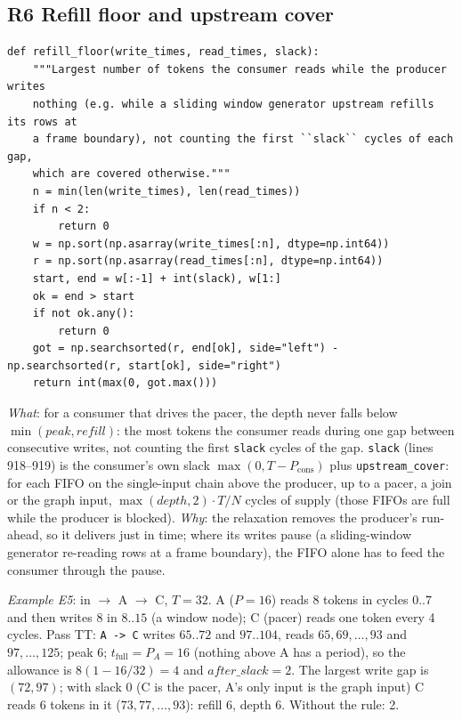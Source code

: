 \documentclass[10pt,a4paper]{article}
\newcommand{\code}[1]{\texttt{#1}}
\newcommand{\Tg}{T}           %
\newcommand{\NF}{N}            %
\begin{document}
\subsection{R6 Refill floor and upstream cover}\label{sec:refill}

\begin{lstlisting}[firstnumber=765,title={\texttt{src/finn/transformation/fpgadataflow/derive\_characteristic.py}, lines 765--780}]
def refill_floor(write_times, read_times, slack):
    """Largest number of tokens the consumer reads while the producer writes
    nothing (e.g. while a sliding window generator upstream refills its rows at
    a frame boundary), not counting the first ``slack`` cycles of each gap,
    which are covered otherwise."""
    n = min(len(write_times), len(read_times))
    if n < 2:
        return 0
    w = np.sort(np.asarray(write_times[:n], dtype=np.int64))
    r = np.sort(np.asarray(read_times[:n], dtype=np.int64))
    start, end = w[:-1] + int(slack), w[1:]
    ok = end > start
    if not ok.any():
        return 0
    got = np.searchsorted(r, end[ok], side="left") - np.searchsorted(r, start[ok], side="right")
    return int(max(0, got.max()))
\end{lstlisting}

\emph{What}: for a consumer that drives the pacer, the depth never falls below
$\min(\mathit{peak},\mathit{refill})$: the most tokens the consumer reads during
one gap between consecutive writes, not counting the first \code{slack} cycles of
the gap. \code{slack} (lines 918--919) is the consumer's own slack
$\max(0,\Tg-P_{\mathrm{cons}})$ plus \code{upstream\_cover}: for each FIFO on the
single-input chain above the producer, up to a pacer, a join or the graph input,
$\max(\mathit{depth},2)\cdot\Tg/\NF$ cycles of supply (those FIFOs are full while the
producer is blocked). \emph{Why}: the relaxation removes the producer's run-ahead,
so it delivers just in time; where its writes pause (a sliding-window generator
re-reading rows at a frame boundary), the FIFO alone has to feed the consumer
through the pause.

\emph{Example E5}: in $\to$ A $\to$ C, $\Tg=32$. A ($P=16$) reads 8 tokens in cycles
$0..7$ and then writes 8 in $8..15$ (a window node); C (pacer) reads one token every 4
cycles. Pass TT: \code{A -> C} writes $65..72$ and $97..104$, reads
$65,69,\dots,93$ and $97,\dots,125$; peak 6; $t_{\mathrm{full}}=P_A=16$ (nothing above A
has a period), so the allowance is $8(1-16/32)=4$ and $\mathit{after\_slack}=2$. The largest
write gap is $(72,97)$; with slack 0 (C is the pacer, A's only input is the graph
input) C reads 6 tokens in it ($73,77,\dots,93$): refill 6, depth 6. Without the
rule: 2.
\end{document}
